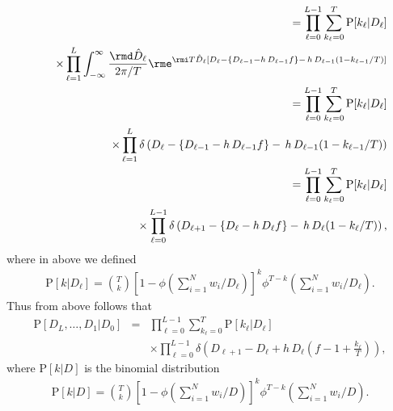 \documentclass[10pt]{iopart}
\newcommand{\1}{\mathbf{1}}
\newcommand{\Prob}{\mathrm{P}}
\begin{document}
\begin{eqnarray}
%
&&=\prod_{\ell=0}^{L-1}\sum_{k_\ell=0}^T\Prob[k_\ell\vert D_\ell]\nonumber\\
&&~~~\times\prod_{\ell=1}^{L}\int_{-\infty}^{\infty}\frac{\rmd\hat{D}_\ell}{2\pi/T}\rme^{\rmi T\hat{D}_\ell \left[D_{\ell}- \left\{D_{\ell-1}-h\,D_{\ell-1}f \right\}- \,h\,D_{\ell-1} (1-k_{\ell-1}/T)\right]}\nonumber\\
%
&&=\prod_{\ell=0}^{L-1}\sum_{k_\ell=0}^T\Prob[k_\ell\vert D_\ell]\nonumber\\
&&~~~\times\prod_{\ell=1}^{L}\delta\left(D_{\ell}- \left\{D_{\ell-1}-h\,D_{\ell-1}f \right\}- \,h\,D_{\ell-1} (1-k_{\ell-1}/T)\right)\nonumber\\
%
&&=\prod_{\ell=0}^{L-1}\sum_{k_\ell=0}^T\Prob[k_\ell\vert D_\ell]\nonumber\\
&&~~~\times\prod_{\ell=0}^{L-1}\delta\left(D_{\ell+1}- \left\{D_{\ell}-h\,D_{\ell}f \right\}- \,h\,D_{\ell} (1-k_{\ell}/T)\right),
%
\end{eqnarray}
%
where in above we defined 
%
\begin{eqnarray}
\Prob[k\vert D_\ell]={T\choose k}\left[1-\phi\left(\sum_{i=1}^Nw_i/D_\ell\right)\right]^k\phi^{T-k}\left(\sum_{i=1}^Nw_i/D_\ell\right).
\end{eqnarray}
%
Thus from above follows that 
%
\begin{eqnarray}
\Prob\left[D_{L},\ldots,D_{1}\vert D_{0}\right]
%
&=&\prod_{\ell=0}^{L-1}\sum_{k_\ell=0}^T\Prob[k_\ell\vert D_\ell]\nonumber\\
&&\times\prod_{\ell=0}^{L-1}\delta\left(D_{\ell+1}- D_{\ell}+ h\,D_{\ell}\left(f- 1+\frac{k_{\ell}}{T}\right)\right),
%
\end{eqnarray}
%
where $\Prob[k\vert D]$ is the binomial distribution
%
\begin{eqnarray}
\Prob[k\vert D]={T\choose k}\left[1-\phi\left(\sum_{i=1}^Nw_i/D\right)\right]^k\phi^{T-k}\left(\sum_{i=1}^Nw_i/D\right).
\end{eqnarray}
%
\end{document}
